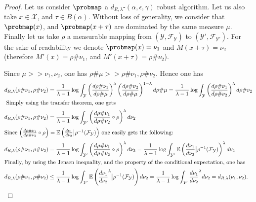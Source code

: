 \begin{proof}
  Let us consider $\probmap$ a $d_{R,\lambda}$-$(\alpha,\epsilon,\gamma)$ robust algorithm. Let us also take $x\in \mathcal{X}$, and $\tau \in B(\alpha)$.
  Without loss of generality, we consider that $\probmap(x)$, and $\probmap(x+\tau)$ are dominated by the same measure $\mu$.
  Finally let us take $\rho$ a measurable mapping from $(\mathcal{Y},\mathcal{F}_{\mathcal{Y}})$ to $(\mathcal{Y'},\mathcal{F}_{\mathcal{Y'}})$. For the sake of readability we denote $\probmap(x) =\nu_1$ and $M(x +\tau)=\nu_2$ (therefore $M'(x)=\rho \#\nu_1$, and $M'(x +\tau)=\rho \#\nu_2$).

  Since $\mu >> \nu_1, \nu_2$, one has $\rho \# \mu >> \rho \# \nu_1, \rho \#\nu_2$. Hence one has 
  \begin{align}
      d_{R,\lambda}(\rho \# \nu_1,\rho \# \nu_2) &= \frac{1}{\lambda - 1} \log \int_{\mathcal{Y}} \left(\frac{d\rho \# \nu_1}{d \rho \# \mu}\right)^{\lambda} \left(\frac{d\rho \# \nu_2}{d \rho \# \mu}\right)^{1-\lambda} d\rho \# \mu = \frac{1}{\lambda - 1} \log \int_{\mathcal{Y}} \left(\frac{d\rho \# \nu_1}{d \rho \# \nu_2}\right)^{\lambda} d\rho \# \nu_2\\
      \intertext{ Simply using the transfer theorem, one gets}
       d_{R,\lambda}(\rho \# \nu_1,\rho \# \nu_2) &= \frac{1}{\lambda - 1} \log \int_{\mathcal{Y'}} \left(\frac{d\rho \# \nu_1}{d \rho \# \nu_2} \circ \rho \right)^{\lambda} d\nu_2\\
      \intertext{Since $\left(\frac{d\rho \# \nu_1}{d \rho \# \nu_2} \circ \rho \right)= \mathbb{E}\left(\frac{d\nu_{1}}
     {d\nu_{2}}\big |\rho^{-1}(\mathcal{F}_{\mathcal{Y}})\right)$ one easily gets the following:}
     d_{R,\lambda}(\rho \# \nu_1,\rho \# \nu_2) & = \frac{1}{\lambda - 1} \log \int_{\mathcal{Y'}} \left(\frac{d\rho \# \nu_1}{d \rho \# \nu_2} \circ \rho \right)^{\lambda} d\nu_2 =  \frac{1}{\lambda - 1} \log \int_{\mathcal{Y'}} \mathbb{E}\left(\frac{d\nu_{1}}
     {d\nu_{2}}\big |\rho^{-1}(\mathcal{F}_{\mathcal{Y}})\right)^{\lambda} d\nu_{2}\\
     \intertext{Finally, by using the Jensen inequality, and the property of the conditional expectation, one has}
     d_{R,\lambda}(\rho \# \nu_1,\rho \# \nu_2)& \leq \frac{1}{\lambda - 1} \log \int_{\mathcal{Y'}} \mathbb{E}\left(\frac{d\nu_{1}}
     {d\nu_{2}}^{\lambda}\big |\rho^{-1}(\mathcal{F}_{\mathcal{Y}})\right) d\nu_{2}= \frac{1}{\lambda - 1} \log \int_{\mathcal{Y'}} \frac{d\nu_{1}}
     {d\nu_{2}}^{\lambda} d\nu_{2} = d_{R,\lambda}(\nu_{1},\nu_{2}).
  \end{align}
\end{proof}


